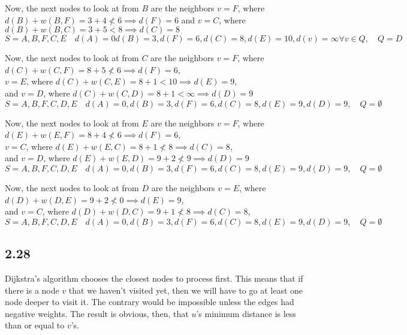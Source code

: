 \documentclass[letterpaper,12pt]{article}
\theoremstyle{definition}
\begin{document}
Now, the next nodes to look at from $B$ are the neighbors $v=F$, where $d(B) + w(B,F) = 3+4 \not < 6 \implies d(F) = 6$
and $v=C$, where $d(B) + w(B,C) = 3+5 < 8 \implies d(C) = 8$
\[ S = A,B,F,C,E \quad d(A) = 0 d(B) = 3, d(F) = 6, d(C) = 8,d(E) = 10,d(v) = \infty \forall v\in Q, \quad Q = D\]

Now, the next nodes to look at from $C$ are the neighbors $v=F$, where $d(C) + w(C,F) = 8+5 \not < 6 \implies d(F) = 6$,
\\$v=E$, where $d(C) + w(C,E) = 8+1 < 10 \implies d(E) = 9$,
\\and $v=D$, where $d(C) + w(C,D) = 8+1 < \infty \implies d(D) = 9$
\[ S = A,B,F,C,D,E \quad d(A) = 0, d(B) = 3,d(F) = 6,d(C) = 8,d(E) = 9,d(D) = 9, \quad Q = \emptyset\]

Now, the next nodes to look at from $E$ are the neighbors $v=F$, where $d(E) + w(E,F) = 8+4 \not < 6 \implies d(F) = 6$,
\\$v=C$, where $d(E) + w(E,C) = 8+1 \not< 8 \implies d(C) = 8$,
\\and $v=D$, where $d(E) + w(E,D) = 9+2 \not< 9 \implies d(D) = 9$
\[ S = A,B,F,C,D,E \quad d(A) = 0, d(B) = 3,d(F) = 6,d(C) = 8,d(E) = 9,d(D) = 9, \quad Q = \emptyset\]

Now, the next nodes to look at from $D$ are the neighbors $v=E$, where $d(D) + w(D,E) = 9+2 \not < 0 \implies d(E) = 9$,
\\and $v=C$, where $d(D) + w(D,C) = 9+1 \not< 8 \implies d(C) = 8$,
\[ S = A,B,F,C,D,E \quad d(A) = 0, d(B) = 3,d(F) = 6,d(C) = 8,d(E) = 9,d(D) = 9, \quad Q = \emptyset\]
\subsection*{2.28}
Dijkstra's algorithm chooses the closest nodes to process first. This means that if there is a node $v$ that we haven't visited yet, then we will have to go at least one node deeper to visit it. The contrary would be impossible unless the edges had negative weights. The result is obvious, then, that $u$'s minimum distance is less than or equal to $v$'s.
\end{document}
